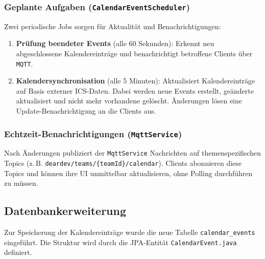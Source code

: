 \documentclass[12pt,a4paper]{report}
\begin{document}
    \subsubsection{Geplante Aufgaben (\texttt{CalendarEventScheduler})}
        Zwei periodische Jobs sorgen für Aktualität und Benachrichtigungen:
        \begin{enumerate}
            \item \textbf{Prüfung beendeter Events} (alle 60 Sekunden):
                Erkennt neu abgeschlossene Kalendereinträge und benachrichtigt betroffene Clients über \texttt{MQTT}.
            \item \textbf{Kalendersynchronisation} (alle 5 Minuten):
                Aktualisiert Kalendereinträge auf Basis externer ICS-Daten.
                Dabei werden neue Events erstellt, geänderte aktualisiert und nicht mehr vorhandene gelöscht.
                Änderungen lösen eine Update-Benachrichtigung an die Clients aus.
        \end{enumerate}

    \subsubsection{Echtzeit-Benachrichtigungen (\texttt{MqttService})}
        Nach Änderungen publiziert der \texttt{MqttService} Nachrichten auf themenspezifischen Topics (z.\,B. \texttt{deardev/teams/\{teamId\}/calendar}).
        Clients abonnieren diese Topics und können ihre UI unmittelbar aktualisieren, ohne Polling durchführen zu müssen.


\subsection{Datenbankerweiterung}

        Zur Speicherung der Kalendereinträge wurde die neue Tabelle \texttt{calendar\_events} eingeführt.
        Die Struktur wird durch die JPA-Entität \texttt{CalendarEvent.java} definiert.
\end{document}
